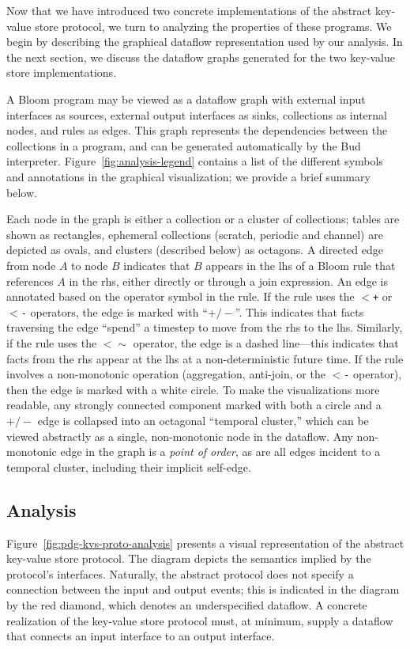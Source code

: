 Now that we have introduced two concrete implementations of the abstract
key-value store protocol, we turn to analyzing the properties of these
programs. We begin by describing the graphical dataflow representation used by
our analysis. In the next section, we discuss the dataflow graphs generated for
the two key-value store implementations.

A Bloom program may be viewed as a dataflow graph with external input interfaces
as sources, external output interfaces as sinks, collections as internal nodes,
and rules as edges. This graph represents the dependencies between the
collections in a program, and can be generated automatically by the Bud
interpreter. Figure~\ref{fig:analysis-legend} contains a list of the different
symbols and annotations in the graphical visualization; we provide a brief
summary below.

Each node in the graph is either a collection or a cluster of collections;
tables are shown as rectangles, ephemeral collections (scratch, periodic and
channel) are depicted as ovals, and clusters (described below) as octagons. A
directed edge from node $A$ to node $B$ indicates that $B$ appears in the lhs of
a Bloom rule that references $A$ in the rhs, either directly or through a join
expression. An edge is annotated based on the operator symbol in the rule. If
the rule uses the \texttt{$<$+} or \texttt{$<$-} operators, the edge is marked
with ``$+/-$''. This indicates that facts traversing the edge ``spend'' a
timestep to move from the rhs to the lhs. Similarly, if the rule uses the
\texttt{$<\sim$} operator, the edge is a dashed line---this indicates that facts
from the rhs appear at the lhs at a non-deterministic future time. If the rule
involves a non-monotonic operation (aggregation, anti-join, or the \texttt{$<$-}
operator), then the edge is marked with a white circle.  To make the
visualizations more readable, any strongly connected component marked with both
a circle and a $+/-$ edge is collapsed into an octagonal ``temporal cluster,''
which can be viewed abstractly as a single, non-monotonic node in the
dataflow. Any non-monotonic edge in the graph is a \emph{point of order}, as are
all edges incident to a temporal cluster, including their implicit self-edge.

\subsection{Analysis}
Figure~\ref{fig:pdg-kvs-proto-analysis} presents a visual representation of the
abstract key-value store protocol. The diagram depicts the semantics implied by
the protocol's interfaces. Naturally, the abstract protocol does not specify a
connection between the input and output events; this is indicated in the diagram
by the red diamond, which denotes an underspecified dataflow. A concrete
realization of the key-value store protocol must, at minimum, supply a dataflow
that connects an input interface to an output interface.

